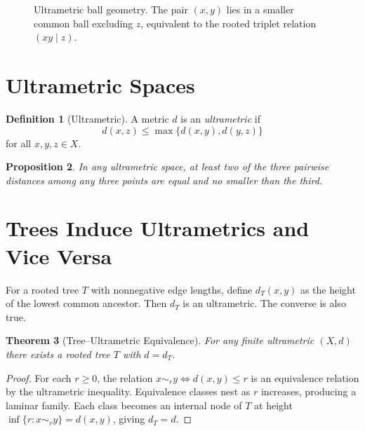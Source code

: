 \documentclass[12pt,a4paper,oneside]{book}
\numberwithin{equation}{chapter}
\theoremstyle{plain}
\newtheorem{theorem}{Theorem}[chapter]
\newtheorem{proposition}[theorem]{Proposition}
\theoremstyle{definition}
\newtheorem{definition}[theorem]{Definition}
\theoremstyle{remark}
\begin{document}
\begin{figure}[htbp]
\centering
{}
\caption{Ultrametric ball geometry. The pair $(x,y)$ lies in a
smaller common ball excluding $z$, equivalent to the rooted triplet
relation $(xy\mid z)$.}
\label{fig:ultrametric-balls}
\end{figure}

\section{Ultrametric Spaces}

\begin{definition}[Ultrametric]
A metric $d$ is an \emph{ultrametric} if
\[
d(x,z) \le \max\{d(x,y), d(y,z)\}
\]
for all $x,y,z \in X$.
\end{definition}

\begin{proposition}
In any ultrametric space, at least two of the three pairwise
distances among any three points are equal and no smaller than the
third.
\end{proposition}

\section{Trees Induce Ultrametrics and Vice Versa}

For a rooted tree $T$ with nonneg\-ative edge lengths, define $d_T(x,y)$
as the height of the lowest common ancestor. Then $d_T$ is an
ultrametric. The converse is also true.

\begin{theorem}[Tree--Ultrametric Equivalence]
\label{thm:tree-ultrametric}
For any finite ultrametric $(X,d)$ there exists a rooted tree $T$
with $d = d_T$.
\end{theorem}

\begin{proof}
For each $r \geq 0$, the relation $x \sim_r y \Leftrightarrow d(x,y)
\leq r$ is an equivalence relation by the ultrametric inequality.
Equivalence classes nest as $r$ increases, producing a laminar family.
Each class becomes an internal node of $T$ at height $\inf\{r : x
\sim_r y\} = d(x,y)$, giving $d_T = d$.
\end{proof}
\end{document}
